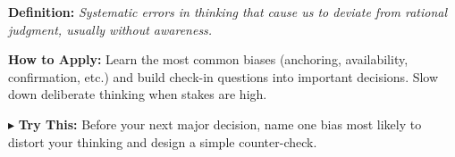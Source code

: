 \begin{tcolorbox}[title={\small \textbf{12 | Cognitive Biases}},
  colback=blue!5!white, colframe=blue!40!black,
  fonttitle=\bfseries\small, boxrule=0.5pt]
\textbf{Definition:} \textit{Systematic errors in thinking that cause us to deviate from rational judgment, usually without awareness.}

\medskip
\textbf{How to Apply:} Learn the most common biases (anchoring, availability, confirmation, etc.) and build check-in questions into important decisions. Slow down deliberate thinking when stakes are high.

\medskip
$\blacktriangleright$ \textbf{Try This:} Before your next major decision, name one bias most likely to distort your thinking and design a simple counter-check.
\end{tcolorbox}


